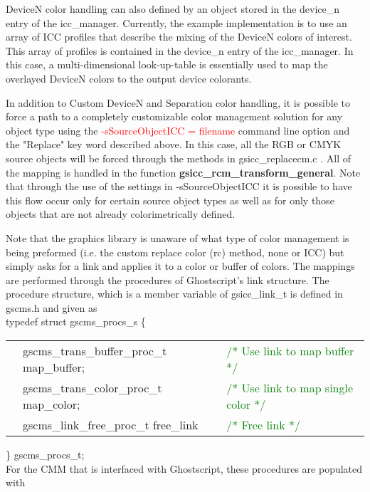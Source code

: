 \documentclass[12pt,notitlepage]{article}
\begin{document}
DeviceN color handling can also defined by an object stored in the device\_n entry of the icc\_manager.  Currently, the example implementation is to use an array of ICC profiles that describe the mixing of the DeviceN colors of interest.  This array of profiles is contained in the device\_n entry of the icc\_manager.  In this case, a multi-dimensional look-up-table is essentially used to map the overlayed DeviceN colors to the output device colorants.

In addition to Custom DeviceN and Separation color handling, it is possible to force a path to a completely customizable color management solution for any object type using the \textcolor{red}{-sSourceObjectICC = filename} command line option and the "Replace" key word described above.  In this case, all the RGB or CMYK source objects will be forced through the methods in gsicc\_replacecm.c .  All of the mapping is handled in the function {\bf gsicc\_rcm\_transform\_general}.  Note that through the use of the settings in -sSourceObjectICC it is possible to have this flow occur only for certain source object types as well as for only those objects that are not already colorimetrically defined.

Note that the graphics library is unaware of what type of color management is being preformed (i.e. the custom replace color (rc) method, none or ICC) but simply asks for a link and applies it to a color or buffer of colors.
The mappings are performed through the procedures of Ghostscript's link structure. The procedure structure, which is a member variable of gsicc\_link\_t is defined in gscms.h and given as\\

\noindent typedef struct gscms\_procs\_s \{

\begin{tabular}{lll}
  & gscms\_trans\_buffer\_proc\_t map\_buffer;   & 	\textcolor{green}{/* Use link to map buffer */}  \\
  & gscms\_trans\_color\_proc\_t  map\_color;   & 	\textcolor{green}{/* Use link to map single color */}   \\
  & gscms\_link\_free\_proc\_t free\_link    &	 \textcolor{green}{/* Free link */}    \\
\end{tabular}

\noindent  \} gscms\_procs\_t;\\

For the CMM that is interfaced with Ghostscript, these procedures are populated with\\
\end{document}
